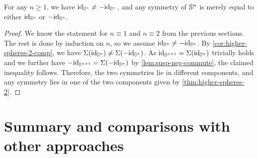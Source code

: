 \documentclass[english,a4paper]{lmcs}
\begin{document}
\begin{cor}\label{cor:id-not-minus-id}
	For any $n \geq 1$, we have $\mathord{\mathrm{id}}_{{\mathbb S^{n}}} \neq -\mathord{\mathrm{id}}_{{\mathbb S^{n}}}$, and any symmetry of ${\mathbb S^{n}}$ is merely equal to either $\mathord{\mathrm{id}}_{{\mathbb S^{n}}}$ or $-\mathord{\mathrm{id}}_{{\mathbb S^{n}}}$.
\end{cor}
\begin{proof}
	We know the statement for $n \equiv 1$ and $n \equiv 2$ from the previous sections.
	The rest is done by induction on $n$, so we assume $\mathord{\mathrm{id}}_{{\mathbb S^{n}}} \neq -\mathord{\mathrm{id}}_{{\mathbb S^{n}}}$.
	By
	\cref{cor:higher-spheres-2-comp}, we have $\operatorname{\Sigma}(\mathord{\mathrm{id}}_{{\mathbb S^{n}}}) \neq \operatorname{\Sigma}(-\mathord{\mathrm{id}}_{{\mathbb S^{n}}})$.
	As $\mathord{\mathrm{id}}_{{\mathbb S^{n+1}}} = \operatorname{\Sigma}(\mathord{\mathrm{id}}_{{\mathbb S^{n}}})$ trivially holds and
	we further have $-\mathord{\mathrm{id}}_{{\mathbb S^{n+1}}} = \operatorname{\Sigma}(-\mathord{\mathrm{id}}_{{\mathbb S^{n}}})$
	by \cref{lem:susp-neg-commute}, the claimed inequality follows.
	Therefore, the two symmetries lie in different components, and any symmetry lies in one of the two components given by \cref{thm:higher-spheres-2}.
\end{proof}

\section{Summary and comparisons with other approaches}
\end{document}
